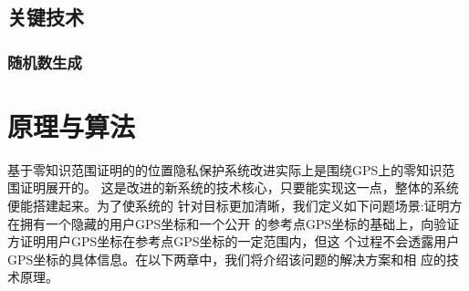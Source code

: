 \documentclass[zihao=-4]{ctexart}
\begin{document}
\subsection{关键技术}
\subsubsection{随机数生成}




\section{原理与算法}
基于零知识范围证明的的位置隐私保护系统改进实际上是围绕GPS上的零知识范围证明展开的。
这是改进的新系统的技术核心，只要能实现这一点，整体的系统便能搭建起来。为了使系统的
针对目标更加清晰，我们定义如下问题场景:证明方在拥有一个隐藏的用户GPS坐标和一个公开
的参考点GPS坐标的基础上，向验证方证明用户GPS坐标在参考点GPS坐标的一定范围内，但这
个过程不会透露用户GPS坐标的具体信息。在以下两章中，我们将介绍该问题的解决方案和相
应的技术原理。
\end{document}

